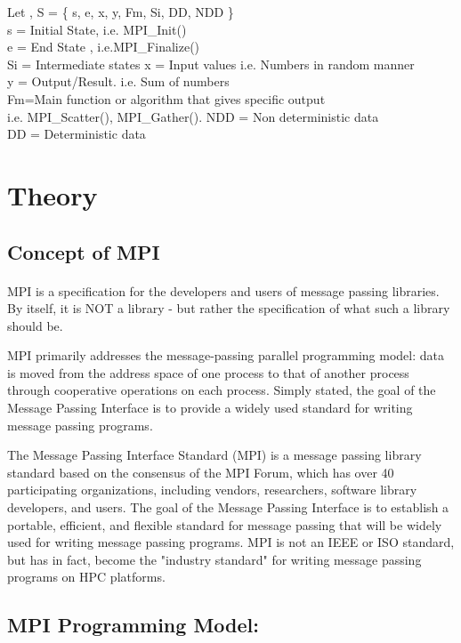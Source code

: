 \documentclass[a4paper,12pt]{article}
\begin{document}
	Let ,  
	S = \{ s, e, x, y, Fm, Si, DD, NDD \} \\
	s = Initial State, i.e. MPI\_Init() \\
	e = End State , i.e.MPI\_Finalize() \\
	Si = Intermediate states x = Input values i.e. Numbers in random manner\\
	 y = Output/Result. i.e. Sum of numbers  \\
	  Fm=Main function or algorithm that gives specific output \\
	   i.e. MPI\_Scatter(), MPI\_Gather(). 
	 NDD = Non deterministic data \\
	 DD = Deterministic data 
	
\section{Theory}
	\subsection{Concept of MPI}
		\paragraph{} MPI is a specification for the developers and users of message passing libraries. By itself, it is NOT a library - but rather the specification of what such a library should be. 
		
		MPI primarily addresses the message-passing parallel programming model: data is moved from the address space of one process to that of another process through cooperative operations on each process. 	 
		Simply stated, the goal of the Message Passing Interface is to provide a widely used standard for writing message passing programs. 
		
		The Message Passing Interface Standard (MPI) is a message passing library standard based on the consensus of the MPI Forum, which has over 40 participating organizations, including vendors, researchers, software library developers, and users. 	 
		The goal of the Message Passing Interface is to establish a portable, efficient, and flexible standard for message passing that will be widely used for writing message passing programs. MPI is not an IEEE or ISO standard, but has in fact, become the "industry standard" for writing message passing programs on HPC platforms. 
	
		
\subsection{MPI Programming Model:}	
\end{document}
